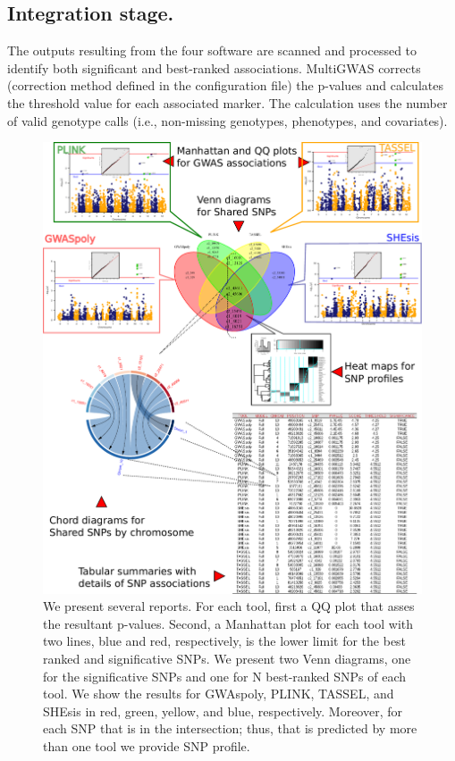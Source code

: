 \subsection{Integration stage.} 
The outputs resulting from the four software are scanned and processed to identify both significant and best-ranked associations. MultiGWAS corrects (correction method defined in the configuration file) the p-values and calculates the threshold value for each associated marker. The calculation uses the number of valid genotype calls (i.e., non-missing genotypes, phenotypes, and covariates).

\begin{figure}
\includegraphics[width=12cm]{images/report-methodologies-all-plots}
\caption{We present several reports. For each tool, first a QQ plot that asses the resultant p-values.  Second, a Manhattan plot for each tool with two lines, blue and red, respectively, is the lower limit for the best ranked and significative SNPs. We present two Venn diagrams, one for the significative SNPs and one for N best-ranked SNPs of each tool. We show the results for GWAspoly, PLINK, TASSEL, and SHEsis in red, green, yellow, and blue, respectively. Moreover, for each SNP that is in the intersection; thus, that is predicted by more than one tool we provide SNP profile. \label{reports}}

\end{figure}

